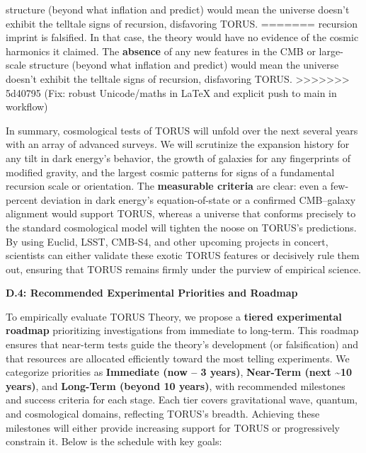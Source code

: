 \documentclass[]{article}
\begin{document}
{\begin{itemize}
\begin{itemize}
    structure (beyond what inflation and \LambdaCDM predict) would mean the
    universe doesn't exhibit the telltale signs of recursion,
    disfavoring TORUS.
=======
    recursion imprint is falsified​. In that case, the theory would have
    no evidence of the cosmic harmonics it claimed. The \textbf{absence}
    of any new features in the CMB or large-scale structure (beyond what
    inflation and \LambdaCDM predict) would mean the universe doesn't exhibit
    the telltale signs of recursion, disfavoring TORUS.
>>>>>>> 5d40795 (Fix: robust Unicode/maths in LaTeX and explicit push to main in workflow)
  \end{itemize}
\end{itemize}

In summary, cosmological tests of TORUS will unfold over the next
several years with an array of advanced surveys. We will scrutinize the
expansion history for any tilt in dark energy's behavior, the growth of
galaxies for any fingerprints of modified gravity, and the largest
cosmic patterns for signs of a fundamental recursion scale or
orientation. The \textbf{measurable criteria} are clear: even a
few-percent deviation in dark energy's equation-of-state or a confirmed
CMB--galaxy alignment would support TORUS, whereas a universe that
conforms precisely to the standard cosmological model will tighten the
noose on TORUS's predictions. By using Euclid, LSST, CMB-S4, and other
upcoming projects in concert, scientists can either validate these
exotic TORUS features or decisively rule them out, ensuring that TORUS
remains firmly under the purview of empirical science.

\textbf{D.4: Recommended Experimental Priorities and Roadmap}

To empirically evaluate TORUS Theory, we propose a \textbf{tiered
experimental roadmap} prioritizing investigations from immediate to
long-term. This roadmap ensures that near-term tests guide the theory's
development (or falsification) and that resources are allocated
efficiently toward the most telling experiments. We categorize
priorities as \textbf{Immediate (now -- 3 years)}, \textbf{Near-Term
(next \textasciitilde{}10 years)}, and \textbf{Long-Term (beyond 10
years)}, with recommended milestones and success criteria for each
stage. Each tier covers gravitational wave, quantum, and cosmological
domains, reflecting TORUS's breadth. Achieving these milestones will
either provide increasing support for TORUS or progressively constrain
it. Below is the schedule with key goals:

}
\end{document}
